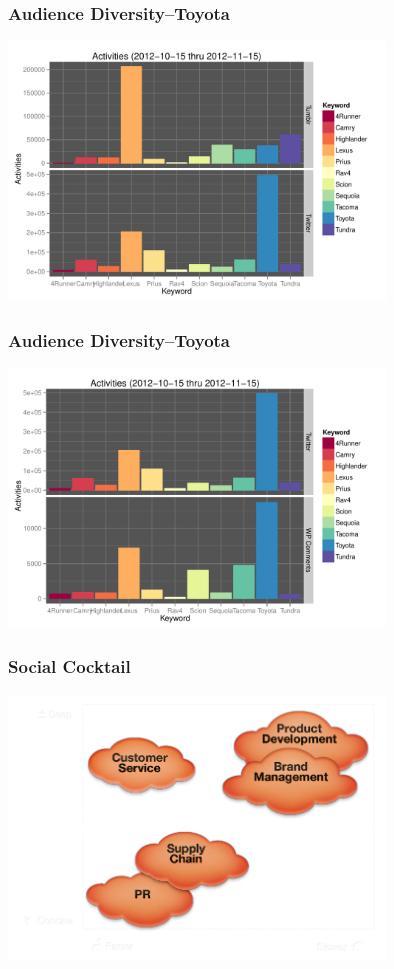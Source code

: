 \documentclass{beamer}
\begin{document}

\begin{frame}\frametitle{Audience Diversity--Toyota}
  \begin{center}
    \includegraphics[width=10cm]{./imgs/bars_twitter_tumblr.pdf}
  \end{center}
\end{frame}

\begin{frame}\frametitle{Audience Diversity--Toyota}
  \begin{center}
    \includegraphics[width=10cm]{./imgs/bars_twitter_wordpress.pdf}
  \end{center}
\end{frame}


\begin{frame}\frametitle{Social Cocktail}
  \begin{center}
    \includegraphics[width=10cm]{./imgs/socialcocktailgrid.png}
  \end{center}
\end{frame}
\end{document}
